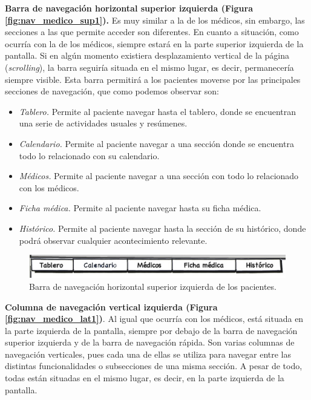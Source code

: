		\bigskip
		\bigskip
		\textbf{Barra de navegación horizontal superior izquierda (Figura \ref{fig:nav_medico_sup1}).} Es muy similar a la de los médicos, sin embargo, las secciones a las que permite acceder son diferentes. En cuanto a situación, como ocurría con la de los médicos, siempre estará en la parte superior izquierda de la pantalla. Si en algún momento existiera desplazamiento vertical de la página (\textit{scrolling}), la barra seguiría situada en el mismo lugar, es decir, permanecería siempre visible. Esta barra permitirá a los pacientes moverse por las principales secciones de navegación, que como podemos observar son:
		\begin{itemize}
			\item \textit{Tablero.} Permite al paciente navegar hasta el tablero, donde se encuentran una serie de actividades usuales y resúmenes.
			\item \textit{Calendario.} Permite al paciente navegar a una sección donde se encuentra todo lo relacionado con su calendario.
			\item \textit{Médicos.} Permite al paciente navegar a una sección con todo lo relacionado con los médicos.
			\item \textit{Ficha médica.} Permite al paciente navegar hasta su ficha médica.
			\item \textit{Histórico.} Permite al paciente navegar hasta la sección de su histórico, donde podrá observar cualquier acontecimiento relevante.
		\end{itemize}
		
		
		\begin{figure}[H]
		  \centering
		    \includegraphics[width=15cm]{img/jpg/nav/paciente_sup1.jpg}
		  \caption{Barra de navegación horizontal superior izquierda de los pacientes.}
		  \label{fig:nav_paciente_sup1}
		\end{figure}
		
		\textbf{Columna de navegación vertical izquierda (Figura \ref{fig:nav_medico_lat1})}. Al igual que ocurría con los médicos, está situada en la parte izquierda de la pantalla, siempre por debajo de la barra de navegación superior izquierda y de la barra de navegación rápida. Son varias columnas de navegación verticales, pues cada una de ellas se utiliza para navegar entre las distintas funcionalidades o subsecciones de una misma sección. A pesar de todo, todas están situadas en el mismo lugar, es decir, en la parte izquierda de la pantalla.
		
